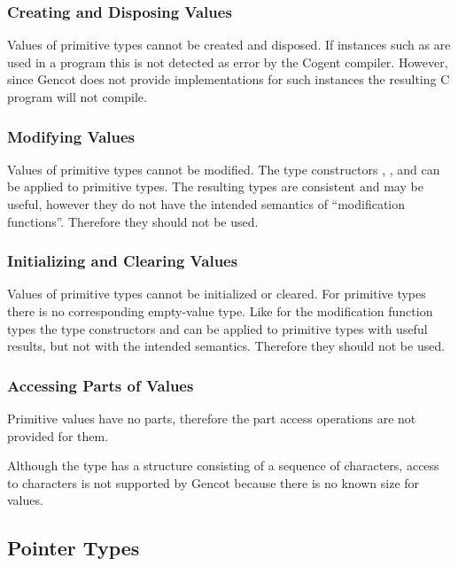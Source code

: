 \subsubsection{Creating and Disposing Values}

Values of primitive types cannot be created and disposed. If instances such as  are used in a program 
this is not detected as error by the Cogent compiler. However, since Gencot does not provide implementations for such
instances the resulting C program will not compile.

\subsubsection{Modifying Values}

Values of primitive types cannot be modified. The type constructors , , and 
can be applied to primitive types. The resulting types are consistent and may be useful, however they do not have the
intended semantics of ``modification functions''. Therefore they should not be used.

\subsubsection{Initializing and Clearing Values}

Values of primitive types cannot be initialized or cleared. For primitive types there is no corresponding empty-value type.
Like for the modification function types the type constructors
 and  can be applied to primitive types with useful results, but not with the intended semantics.
Therefore they should not be used.

\subsubsection{Accessing Parts of Values}

Primitive values have no parts, therefore the part access operations are not provided for them.

Although the type  has a structure consisting of a sequence of characters, access to characters is not supported
by Gencot because there is no known size for  values.

\subsection{Pointer Types}
\label{design-operations-pointer}

